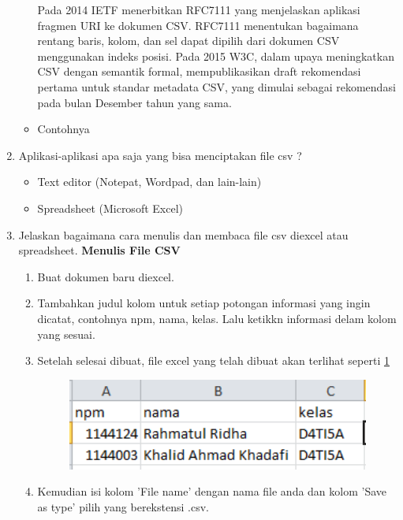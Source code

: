 \begin{enumerate}
\begin{itemize}
     Pada 2014 IETF menerbitkan RFC7111 yang menjelaskan aplikasi fragmen URI ke dokumen CSV. RFC7111 menentukan bagaimana rentang baris, kolom, dan sel dapat dipilih dari dokumen CSV menggunakan indeks posisi. Pada 2015 W3C, dalam upaya meningkatkan CSV dengan semantik formal, mempublikasikan draft rekomendasi pertama untuk standar metadata CSV, yang dimulai sebagai rekomendasi pada bulan Desember tahun yang sama.

     \item Contohnya
       
     \end{itemize}

 \item Aplikasi-aplikasi apa saja yang bisa menciptakan file csv ?
       \begin{itemize}
         \item Text editor (Notepat, Wordpad, dan lain-lain)
         \item Spreadsheet (Microsoft Excel)
       \end{itemize}

 \item Jelaskan bagaimana cara menulis dan membaca file csv diexcel atau spreadsheet.
    \textbf{Menulis File CSV}
       \begin{enumerate}
	   \item Buat dokumen baru diexcel.
       \item Tambahkan judul kolom untuk setiap potongan informasi yang ingin dicatat, contohnya npm, nama, kelas. Lalu ketikkn informasi delam kolom yang sesuai.
	   \item Setelah selesai dibuat, file excel yang telah dibuat akan terlihat seperti \ref{CSV}
		
		\begin{figure}[H]	\includegraphics[width=10cm]{figures/Rahma/Chapter4/1.png}
		\centering
        \label{CSV}
		\end{figure}
		
	   \item Kemudian isi kolom 'File name' dengan nama file anda dan kolom 'Save as type' pilih yang berekstensi .csv.
		

\end{enumerate}
\end{enumerate}
